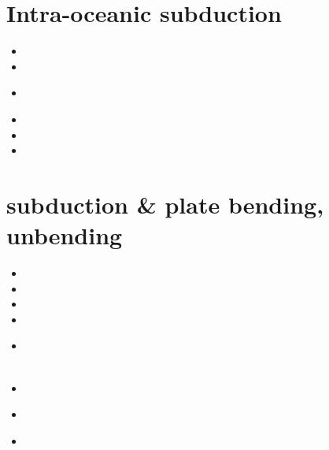 \section{Intra-oceanic subduction}

\begin{small}
\begin{itemize}
\item[\twothousandeleven]
\item[\twothousandthirteen]
\item[\twothousandfifteen]
 \\
\item[\twothousandnineteen]
\item[\twothousandtwentytwo]
\item[\twothousandtwentyfour]
\end{itemize}
\end{small}

\section{subduction \& plate bending, unbending}

\begin{small}
\begin{itemize}
\item[\nineteenninetynine]
\item[\twothousandsix]
\item[\twothousandeight]
\item[\twothousandnine]
\item[\twothousandtwelve]
 \\
 \\
\item[\twothousandfourteen]
\item[\twothousandnineteen]
 \\ 
\item[\twothousandtwentyone]
\end{itemize}
\end{small}

